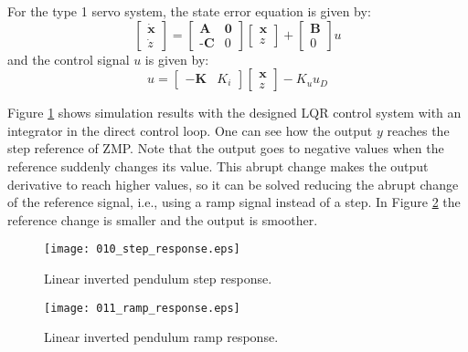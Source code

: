 For the type 1 servo system, the state error equation is given by:
\begin{equation}
\begin{bmatrix}
\dot{\textbf{x}}\\
\dot{z}
\end{bmatrix} = 
\begin{bmatrix}
\textbf{A} & \textbf{0}\\
\textbf{-C} & 0
\end{bmatrix}
\begin{bmatrix}
\textbf{x}\\
z
\end{bmatrix} + 
\begin{bmatrix}
\textbf{B}\\
0
\end{bmatrix}
u
\end{equation}
and the control signal $u$ is given by:
\begin{equation}
u = \begin{bmatrix}
-\textbf{K} & K_i
\end{bmatrix}
\begin{bmatrix}
\textbf{x}\\
z 
\end{bmatrix}
- K_u u_D
\end{equation}

Figure \ref{fig:step_response} shows simulation results with the designed LQR control system with an integrator in the direct control loop. One can see how the output $y$ reaches the step reference of ZMP. Note that the output goes to negative values when the reference suddenly changes its value. This abrupt change makes the output derivative to reach higher values, so it can be solved reducing the abrupt change of the reference signal, i.e., using a ramp signal instead of a step. In Figure \ref{fig:ramp_response} the reference change is smaller and the output is smoother.

\begin{figure}[!hbt]
\centering
\texttt{[image: 010\_step\_response.eps]}
\caption{Linear inverted pendulum step response.}
\label{fig:step_response}
\end{figure}

\begin{figure}[!hbt]
\centering
\texttt{[image: 011\_ramp\_response.eps]}
\caption{Linear inverted pendulum ramp response.}
\label{fig:ramp_response}
\end{figure}








